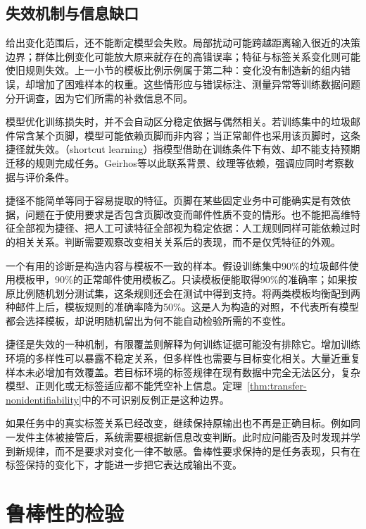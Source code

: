 \subsection{失效机制与信息缺口}
\label{sec:robustness-failure-mechanisms}

给出变化范围后，还不能断定模型会失败。局部扰动可能跨越距离输入很近的决策边界；群体比例变化可能放大原来就存在的高错误率；特征与标签关系变化则可能使旧规则失效。上一小节的模板比例示例属于第二种：变化没有制造新的组内错误，却增加了困难样本的权重。这些情形应与错误标注、测量异常等训练数据问题分开调查，因为它们所需的补救信息不同。

模型优化训练损失时，并不会自动区分稳定依据与偶然相关。若训练集中的垃圾邮件常含某个页脚，模型可能依赖页脚而非内容；当正常邮件也采用该页脚时，这条捷径就失效。（shortcut learning）指模型借助在训练条件下有效、却不能支持预期迁移的规则完成任务。Geirhos等以此联系背景、纹理等依赖，强调应同时考察数据与评价条件。

捷径不能简单等同于容易提取的特征。页脚在某些固定业务中可能确实是有效依据，问题在于使用要求是否包含页脚改变而邮件性质不变的情形。也不能把高维特征全部视为捷径、把人工可读特征全部视为稳定依据：人工规则同样可能依赖过时的相关关系。判断需要观察改变相关关系后的表现，而不是仅凭特征的外观。

一个有用的诊断是构造内容与模板不一致的样本。假设训练集中90\%的垃圾邮件使用模板甲，90\%的正常邮件使用模板乙。只读模板便能取得90\%的准确率；如果按原比例随机划分测试集，这条规则还会在测试中得到支持。将两类模板均衡配到两种邮件上后，模板规则的准确率降为50\%。这是人为构造的对照，不代表所有模型都会选择模板，却说明随机留出为何不能自动检验所需的不变性。

捷径是失效的一种机制，有限覆盖则解释为何训练证据可能没有排除它。增加训练环境的多样性可以暴露不稳定关系，但多样性也需要与目标变化相关。大量近重复样本未必增加有效覆盖。若目标环境的标签规律在现有数据中完全无法区分，复杂模型、正则化或无标签适应都不能凭空补上信息。定理~\ref{thm:transfer-nonidentifiability}中的不可识别反例正是这种边界。

如果任务中的真实标签关系已经改变，继续保持原输出也不再是正确目标。例如同一发件主体被接管后，系统需要根据新信息改变判断。此时应问能否及时发现并学到新规律，而不是要求对变化一律不敏感。鲁棒性要求保持的是任务表现，只有在标签保持的变化下，才能进一步把它表达成输出不变。

\section{鲁棒性的检验}
\label{sec:robustness-evaluation}

